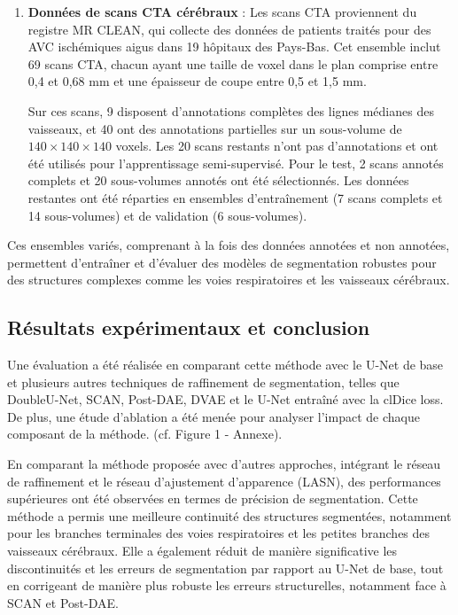 \documentclass[a4paper,12pt]{article}
\begin{document}
\begin{multicols}{2}
\begin{enumerate}
    \item \textbf{Données de scans CTA cérébraux} : Les scans CTA proviennent du registre MR CLEAN, qui
    collecte des données de patients traités pour des AVC ischémiques aigus dans 19 hôpitaux des
    Pays-Bas. Cet ensemble inclut 69 scans CTA, chacun ayant une taille de voxel dans le plan
    comprise entre 0,4 et 0,68 mm et une épaisseur de coupe entre 0,5 et 1,5 mm.

    Sur ces scans, 9 disposent d’annotations complètes des lignes médianes des vaisseaux, et
    40 ont des annotations partielles sur un sous-volume de \(140 \times 140 \times 140\) voxels. Les 20 scans
    restants n’ont pas d’annotations et ont été utilisés pour l’apprentissage semi-supervisé. Pour
    le test, 2 scans annotés complets et 20 sous-volumes annotés ont été sélectionnés. Les données
    restantes ont été réparties en ensembles d’entraînement (7 scans complets et 14 sous-volumes) et
    de validation (6 sous-volumes).
\end{enumerate}

Ces ensembles variés, comprenant à la fois des données annotées et non annotées, permettent
d’entraîner et d’évaluer des modèles de segmentation robustes pour des structures complexes
comme les voies respiratoires et les vaisseaux cérébraux.


\subsection*{Résultats expérimentaux et conclusion}

 Une évaluation a été réalisée en comparant cette méthode avec le U-Net de base et plusieurs autres techniques de raffinement
de segmentation, telles que DoubleU-Net, SCAN, Post-DAE, DVAE et le U-Net entraîné avec
la clDice loss. De plus, une étude d’ablation a été menée pour analyser l’impact de chaque
composant de la méthode. (cf. Figure 1 - Annexe).

En comparant la méthode proposée avec d’autres approches, intégrant le réseau de raffinement
et le réseau d’ajustement d’apparence (LASN), des performances supérieures ont été observées
en termes de précision de segmentation. Cette méthode a permis une meilleure continuité des
structures segmentées, notamment pour les branches terminales des voies respiratoires et les
petites branches des vaisseaux cérébraux. Elle a également réduit de manière significative les
discontinuités et les erreurs de segmentation par rapport au U-Net de base, tout en corrigeant
de manière plus robuste les erreurs structurelles, notamment face à SCAN et Post-DAE.


\end{multicols}
\end{document}
